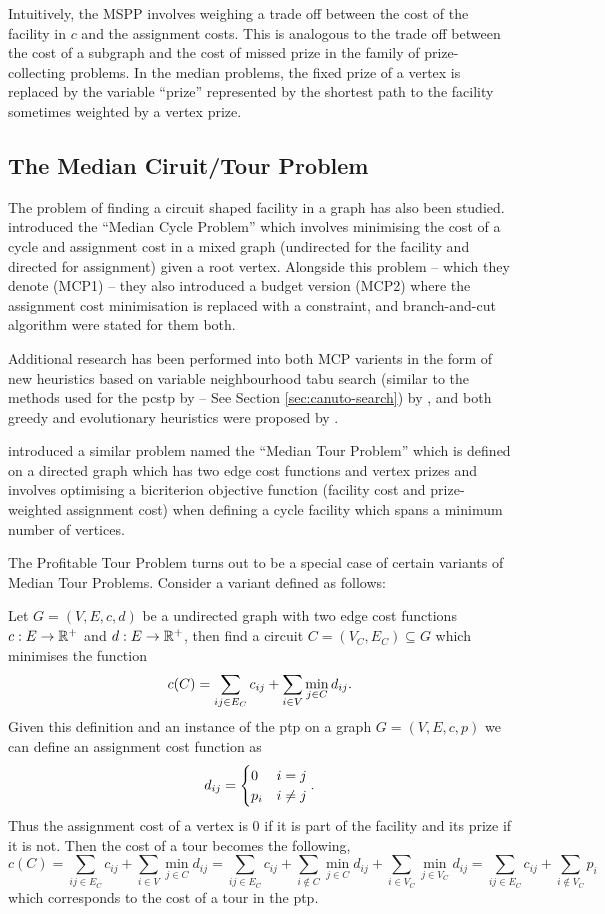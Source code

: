  Intuitively, the MSPP involves weighing a trade off between the cost of the facility
 in $c$ and the assignment costs. 
 This is analogous to the trade off between the cost of a subgraph and the cost of missed prize in the
 family of prize-collecting problems. In the median problems, the fixed prize of a vertex is
 replaced by the variable ``prize'' represented by the shortest path to the facility sometimes weighted
 by a vertex prize.
 \subsection{The Median Ciruit/Tour Problem}
 The problem of finding a circuit shaped facility in a graph has also been studied.
 \citet{labbe1999themedian} introduced the ``Median Cycle Problem'' which involves
 minimising the cost of a cycle and assignment cost in a mixed graph (undirected for
 the facility and directed for assignment) given a root vertex. Alongside this problem
 -- which they denote (MCP1) -- they also introduced a budget version (MCP2) where the
 assignment cost minimisation is replaced with a constraint, and branch-and-cut algorithm
 were stated for them both.

 Additional research has been performed into both MCP varients
 in the form of new heuristics based on variable neighbourhood tabu search
 (similar to the methods used for the \gls{pcstp} by \citet{canuto2001local} --
 See Section \ref{sec:canuto-search}) by \citet{perez2003variable}, and both
 greedy and evolutionary heuristics were proposed by \citet{renaud2004efficient}.
 
 \citet{current1994median} introduced a similar problem named the ``Median Tour Problem''
 which is defined on a directed graph which has two edge cost functions and vertex prizes
 and involves optimising a bicriterion objective function
 (facility cost and prize-weighted assignment cost)
 when defining a cycle facility which spans a minimum number of vertices.

 The Profitable Tour Problem turns out to be a special case of certain variants of Median
 Tour Problems. Consider a variant defined as follows:
 
 Let $G = (V, E, c, d)$ be a undirected graph with two edge cost functions
 $c : E \to \mathbb{R}^+$ and $d : E \to \mathbb{R}^+$, then find a circuit $C = (V_C, E_C) \subseteq G$
 which minimises
 the function
 $$c(C) = \sum_{ij \in E_C} c_{ij} + \sum_{i \in V} \min_{j \in C} d_{ij} \mathnormal{.}$$
 Given this definition and an instance of the \gls{ptp} on a graph $G = (V, E, c, p)$
 we can define an assignment cost function as
 $$d_{ij} =
 \begin{cases}
   0 & i = j \\
   p_i & i \neq j
 \end{cases}\mathnormal{.}
 $$
 Thus the assignment cost of a vertex is 0 if it is part of the facility and its prize
 if it is not. Then the cost of a tour becomes the following,
 $$c(C) = \sum_{ij \in E_C} c_{ij} + \sum_{i \in V} \min_{j \in C} d_{ij} =
 \sum_{ij \in E_C} c_{ij} + \sum_{i \not\in C} \min_{j \in C} d_{ij} + \sum_{i \in V_C} \min_{j \in V_C} d_{ij}
 = \sum_{ij \in E_C} c_{ij} + \sum_{i \not\in V_C}  p_i$$
 which corresponds to the cost of a tour in the \gls{ptp}.
